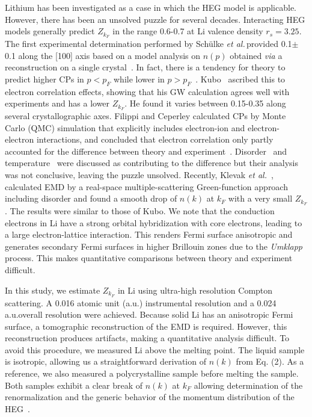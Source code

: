 \documentclass[twocolumn,showpacs,showkeys,fleqn,prl,superscriptaddress]{revtex4}%
\newcommand{\ii}[1]{\textit{#1}}
\begin{document}
Lithium has been investigated as a case in which the HEG model is applicable.
However, there has been an unsolved puzzle for several decades.
Interacting HEG models generally predict $Z_{k_F}$ in the range 0.6-0.7 at Li valence density $r_s=3.25$.
The first experimental determination performed by Sch{\"u}lke \ii{et al.}\,provided 0.1$\pm$0.1 along the [100] axis based on a model analysis on $n(p)$ obtained \ii{via} a reconstruction on a single crystal~\cite{schulke96}.
In fact, there is a tendency %
for theory to predict higher CPs in $p<p_F$ while lower in $p>p_F$~\cite{saku95}.
Kubo~\cite{kubo95,kubo97} ascribed this to electron correlation effects, showing that his GW calculation agrees well with experiments and has a lower $Z_{k_F}$. He found it varies between 0.15-0.35 along several crystallographic axes.
Filippi and Ceperley calculated CPs by Monte Carlo (QMC) simulation that explicitly includes electron-ion and electron-electron interactions, and concluded that electron correlation only partly accounted for the difference between theory and experiment~\cite{filippi99}.
Disorder~\cite{dugdale98} and temperature~\cite{stern01} were discussed as contributing to the difference but their analysis was not conclusive, leaving the puzzle unsolved.
Recently, Klevak \ii{et al.}~\cite{klevak16}, calculated EMD by a real-space multiple-scattering Green-function approach including disorder and found a smooth drop of $n(k)$ at $k_F$ with a very small $Z_{k_F}$. The results were similar to those of Kubo.
We note that the conduction electrons in Li have a strong orbital hybridization with core electrons, leading to a large electron-lattice interaction.
This renders Fermi surface anisotropic and generates secondary Fermi surfaces in higher Brillouin zones due to the {\it{Umklapp}} process.
This makes quantitative comparisons between theory and experiment difficult. 

In this study, we estimate $Z_{k_F}$ in Li using ultra-high resolution Compton scattering. A 0.016 atomic unit (a.u.) instrumental resolution and a 0.024 a.u.\;overall resolution were achieved.
Because solid Li has an anisotropic Fermi surface, a tomographic reconstruction of the EMD is required. However, this reconstruction produces artifacts, making a quantitative analysis difficult.
To avoid this procedure, we measured Li above the melting point.
The liquid sample is isotropic, allowing us a straightforward derivation of $n(k)$ from Eq. (2).
As a reference, we also measured a polycrystalline sample before melting the sample.
Both samples exhibit a clear break of $n(k)$ at $k_F$ allowing determination of the renormalization and the generic behavior of the momentum distribution of the HEG~\cite{holz11}.
\end{document}
